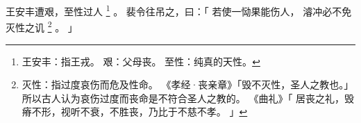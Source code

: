 
\switchcolumn*[\section{}]

王安丰遭艰，至性过人%
\footnote{%
    王安丰：指王戎。
    艰：父母丧。
    至性：纯真的天性。
}%
。
裴令往吊之，曰：「
    若使一恸果能伤人，
    濬冲必不免灭性之讥%
    \footnote{%
        灭性：指过度哀伤而危及性命。
              《孝经·丧亲章》「毁不灭性，圣人之教也。」
              所以古人认为哀伤过度而丧命是不符合圣人之教的。
              《曲礼》「
                  居丧之礼，毁瘠不形，视听不衰，不胜丧，乃比于不慈不孝。
              」
    }%
    。
」

\switchcolumn



